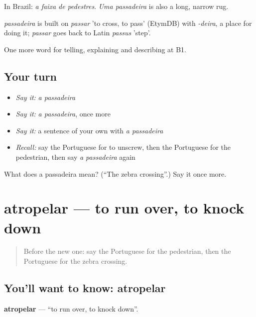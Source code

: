 In Brazil: \emph{a faixa de pedestres}. \emph{Uma passadeira} is also a long, narrow rug.

\begin{cousinweb}
\emph{passadeira} is built on \emph{passar} 'to cross, to pass' (EtymDB) with \emph{-deira}, a place for doing it; \emph{passar} goes back to Latin \emph{passus} 'step'.
\end{cousinweb}

\begin{grammarlens}[title={What you've built}]
One more word for telling, explaining and describing at B1.
\end{grammarlens}

\subsection*{Your turn}
\begin{itemize}
\raggedright
  \item \emph{Say it:} \emph{a passadeira}
  \item \emph{Say it:} \emph{a passadeira}, once more
  \item \emph{Say it:} a sentence of your own with \emph{a passadeira}
  \item \emph{Recall:} say the Portuguese for to unscrew, then the Portuguese for the pedestrian, then say \emph{a passadeira} again
\end{itemize}

\begin{tcolorbox}[breakable,colback=teal!4,colframe=teal!35!black,title={Before you move on}]
What does a passadeira mean? (\textquotedblleft{}The zebra crossing\textquotedblright{}.) Say it once more.
\end{tcolorbox}
\section[atropelar]{atropelar — to run over, to knock down}

\label{lesson:PT-C408-atropelar}



\begin{quote}
Before the new one: say the Portuguese for the pedestrian, then the Portuguese for the zebra crossing.
\end{quote}

\subsection*{You'll want to know: atropelar}
\textbf{atropelar} — \textquotedblleft{}to run over, to knock down\textquotedblright{}.


